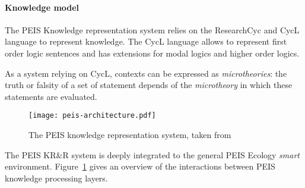 \documentclass{IEEEtran}
\begin{document}


\paragraph{Knowledge model} The PEIS Knowledge representation system relies on
the {\sc ResearchCyc} and {\sc CycL} language to represent knowledge. The {\sc CycL} language
allows to represent first order logic sentences and has extensions for modal logics and higher order logics.


As a system relying on {\sc CycL}, contexts can be expressed as
\emph{microtheories}: the truth or falsity of a set of statement depends of the
\emph{microtheory} in which these statements are evaluated.


\begin{figure}
	\centering
	\texttt{[image: peis-architecture.pdf]}
	\caption{The PEIS knowledge representation system, taken from~\cite{Daoutis2009}}
	\label{fig|peis-archi}
\end{figure}

The PEIS KR\&R system is deeply integrated to the general PEIS Ecology
\emph{smart} environment. Figure~\ref{fig|peis-archi} gives an overview of the
interactions between PEIS knowledge processing layers.
\end{document}
